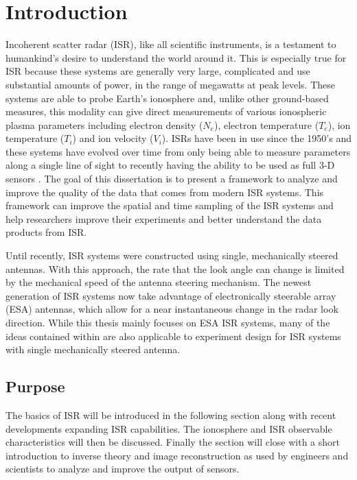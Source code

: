 \chapter{Introduction}
\label{chapter:body}
\thispagestyle{myheadings}
\setcounter{tocdepth}{1}
\graphicspath{{1_Intro/Figures/}}

Incoherent scatter radar (ISR), like all scientific instruments, is a testament to humankind's desire to understand the world around it. This is especially true for ISR because these systems are generally very large, complicated and use substantial amounts of power, in the range of megawatts at peak levels. These systems are able to probe Earth's ionosphere and, unlike other ground-based measures, this modality can give direct measurements of various ionospheric plasma parameters including electron density ($N_e$), electron temperature ($T_e$), ion temperature ($T_i$) and ion velocity ($V_i$). ISRs have been in use since the 1950's \citep{gordon58} and these systems have evolved over time from only being able to measure parameters along a single line of sight to recently having the ability to be used as full 3-D sensors \citep{Semeter2009738,Nicolls:2007ie}. The goal of this dissertation is to present a framework to analyze and improve the quality of the data that comes from modern ISR systems. This framework can  improve the spatial and time sampling of the ISR systems and help researchers improve their experiments and better understand the data products from ISR.

Until recently, ISR systems were constructed using single, mechanically steered antennas. With this approach, the rate that the look angle can change is limited by the mechanical speed of the antenna steering mechanism. The newest generation of ISR systems now take advantage of electronically steerable array (ESA) antennas, which allow for a near instantaneous change in the radar look direction. While this thesis mainly focuses on ESA ISR systems, many of the ideas contained within are also applicable to experiment design for ISR systems with single mechanically steered antenna.
 
\section{Purpose}
The basics of ISR will be introduced in the following section along with recent developments expanding ISR capabilities. The ionosphere and ISR observable characteristics will then be discussed. Finally the section will close with a short introduction to inverse theory and image reconstruction as used by engineers and scientists to analyze and improve the output of sensors.

